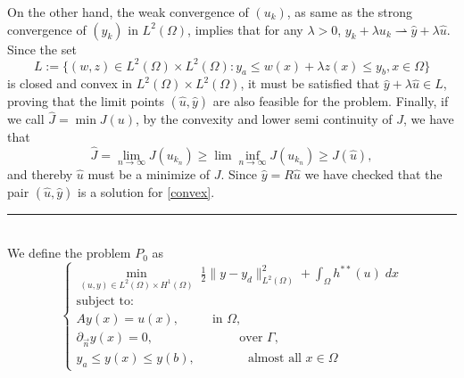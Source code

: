 \documentclass[11pt,a4paper]{amsart}
\newcommand{\kw}{\rule{2mm}{2mm}}
\newcommand{\om}{\Omega}
\renewenvironment{proof}{{Proof.}}{\hfill\kw}
\newcommand{\norm}[1]{\lVert #1 \rVert}
\begin{document}
\begin{proof}
       On the other hand, the weak convergence of $(u_k)$, as same as the strong convergence of $(y_k)$ in $L^2(\Omega)$, implies that for any $\lambda>0$, $y_k+\lambda u_k\rightharpoonup \hat{y}+\lambda\hat{u}$. Since the set
       \[
       L:=\{(w,z)\in L^2(\Omega)\times L^2(\Omega): y_a\le w(x)+\lambda z(x)\le y_b, x\in  \Omega \}
       \]       
       is closed and convex in $ L^2(\Omega)\times L^2(\Omega)$, it must be satisfied that $\hat{y}+\lambda\hat{u}\in L$, proving that the limit points $(\hat{u},\hat{y})$ are also feasible for the problem. Finally, if we call $\hat{J}=\min J(u)$, by the convexity and lower semi continuity of $J$, we have that
       \[
       \hat{J}=\lim_{n\to \infty}J(u_{k_n})\ge \lim\inf_{n\to \infty}J(u_{k_n})\ge J(\hat{u}),
       \]
       and thereby $\hat{u}$ must be a minimize of $J$. Since  $\hat{y}=R\hat{u}$ we have checked that the pair $(\hat{u},\hat{y})$ is a solution for \eqref{convex}.
   \end{proof}\\

    We define the problem $P_0$ as    \begin{equation}\label{P0}\tag{$P_0$}
    \begin{cases}
    \displaystyle\min_{(u,y)\in L^2(\om)\times H^1(\Omega)} \;\frac{1}{2}\norm{y-y_d}^2_{L^2(\om)}+\int_{\Omega}h^{**}(u)\; dx\\
    \mbox{subject to:}\\
    Ay(x)=u(x), \phantom{aaaaa} \mbox{in } \om,\\
    \partial_{\Vec{n}}y(x)=0, \phantom{aaaaaaaaaaaaa} \mbox{over } \Gamma,\\    
    y_a\le y(x)\le y(b),\phantom{aaaaaaaa} \mbox{almost all }x\in \Omega
    \end{cases}
    \end{equation}
    
\end{document}
